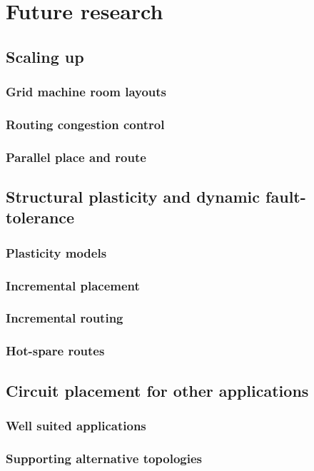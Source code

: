\chapter{Future research}

\section{Scaling up}
	\subsection{Grid machine room layouts}
	\subsection{Routing congestion control}
	\subsection{Parallel place and route}

\section{Structural plasticity and dynamic fault-tolerance}
	\subsection{Plasticity models}
	\subsection{Incremental placement}
	\subsection{Incremental routing}
	\subsection{Hot-spare routes}

\section{Circuit placement for other applications}
	\subsection{Well suited applications}
	\subsection{Supporting alternative topologies}

